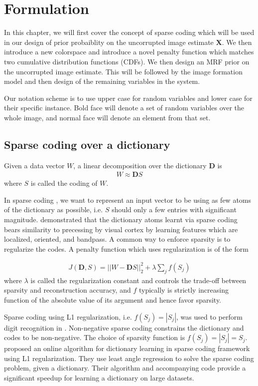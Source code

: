 \chapter{Formulation}

In this chapter, we will first cover the concept of sparse coding which will be used in our design of prior probaiblity on the uncorrupted image estimate $\mathbf{X}$. We then introduce a new colorspace and introduce a novel penalty function which matches two cumulative distribution functions (CDFs). We then design an MRF prior on the uncorrupted image estimate. This will be followed by the image formation model and then design of the remaining variables in the system.

Our notation scheme is to use upper case for random variables and lower case for their specific instance. Bold face will denote a set of random variables over the whole image, and normal face will denote an element from that set.

\section{Sparse coding over a dictionary}
Given a data vector $W$, a linear decomposition over the dictionary $\mathbf{D}$ is
\begin{align}
    W \approx \mathbf{D} S \label{eqn:lineardecomp}
\end{align}
where $S$ is called the coding of $W$.

In sparse coding \cite{harpur1996sc}, we want to represent an input vector to be using as few atoms of the dictionary as possible, i.e. $S$ should only a few entries with significant magnitude. \cite{olshausen1996sparse} demonstrated that the dictionary atoms learnt via sparse coding bears similarity to precessing by visual cortex by learning features which are localized, oriented, and bandpass. A common way to enforce sparsity is to regularize the codes. A penalty function which uses regularization is of the form

\begin{align}
    J(\mathbf{D}, S) = || W - \mathbf{D} S ||_2^2 + \lambda \sum_{j} f(S_{j}) \label{eqn:sparsecoding}
\end{align}
where $\lambda$ is called the regularization constant and controls the trade-off between sparsity and reconstruction accuracy, and $f$ typically is strictly increasing function of the absolute value of its argument and hence favor sparsity.

Sparse coding using L1 regularization, i.e. $f(S_{j}) = | S_{j} |$, was used to perform digit recognition in \cite{mairal2009supervised}. Non-negative sparse coding \cite{hoyer2002nnsc} constrains the dictionary and codes to be non-negative. The choice of sparsity function is $f(S_{j}) = | S_{j} | = S_{j}$. \cite{mairal2009online} proposed an online algorithm for dictionary learning in sparse coding framework using L1 regularization. They use least angle regression to solve the sparse coding problem, given a dictionary. Their algorithm and accompanying code provide a significant speedup for learning a  dictionary on large datasets.


